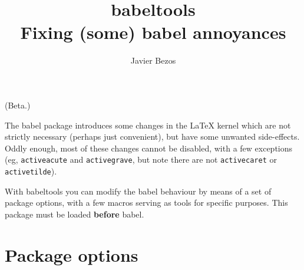 \documentclass{article}
\author{Javier Bezos}
\title{\textsf{babeltools}\\%
\Large Fixing (some) \textsf{babel} annoyances}
\begin{document}
\maketitle

(Beta.)

The \textsf{babel} package introduces some changes in the \LaTeX{}
kernel which are not strictly necessary (perhaps just convenient), but
have some unwanted side-effects.  Oddly enough, most of these changes
cannot be disabled, with a few exceptions (eg, \texttt{activeacute}
and \texttt{activegrave}, but note there are not \texttt{activecaret}
or \texttt{activetilde}). 

With \textsf{babeltools} you can modify the \textsf{babel} behaviour
by means of a set of package options, with a few macros serving as
tools for specific purposes.  This package must be loaded
\textbf{before} \textsf{babel}.

\section{Package options}
\end{document}
